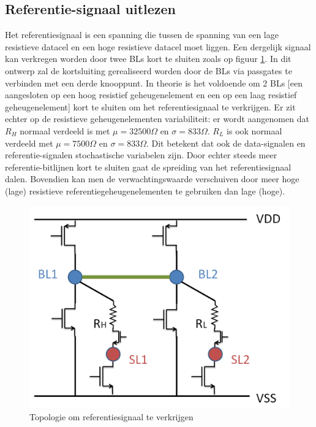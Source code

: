 \subsection{Referentie-signaal uitlezen}
Het referentiesignaal is een spanning die tussen de spanning van een lage resistieve datacel en een hoge resistieve datacel moet liggen. Een dergelijk signaal kan verkregen worden door twee BLs kort te sluiten zoals op figuur \ref{fig:2cellref}. In dit ontwerp zal de kortsluiting gerealiseerd worden door de BLs via passgates te verbinden met een derde knooppunt. In theorie is het voldoende om 2 BLs [een aangesloten op een hoog resistief geheugenelement en een op een laag resistief geheugenelement] kort te sluiten om het referentiesignaal te verkrijgen. Er zit echter op de resistieve geheugenelementen variabiliteit: er wordt aangenomen dat $R_{H}$ normaal verdeeld is met $\mu = 32500\Omega$ en $\sigma = 833\Omega$. $R_{L}$ is ook normaal verdeeld met $\mu = 7500\Omega$ en $\sigma = 833\Omega$. Dit betekent dat ook de data-signalen en referentie-signalen stochastische variabelen zijn.
Door echter steeds meer referentie-bitlijnen kort te sluiten gaat de spreiding van het referentiesignaal dalen. Bovendien kan men de verwachtingswaarde verschuiven door meer hoge (lage) resistieve referentiegeheugenelementen te gebruiken dan lage (hoge).

\begin{figure}
  \centering
  \includegraphics[scale=0.3]{../fig/hfdstk-architecture-ref2cell.png}
  \caption{Topologie om referentiesignaal te verkrijgen}
  \label{fig:2cellref}
\end{figure}

